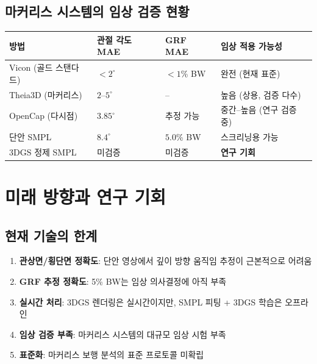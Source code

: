 \documentclass[11pt, a4paper]{report}
\begin{document}
\section{마커리스 시스템의 임상 검증 현황}

\begin{center}
\renewcommand{\arraystretch}{1.3}
\small
\begin{tabular}{p{3cm}p{2cm}p{2.5cm}p{4.5cm}}
\toprule
\textbf{방법} & \textbf{관절 각도 MAE} & \textbf{GRF MAE} & \textbf{임상 적용 가능성} \\
\midrule
Vicon (골드 스탠다드) & $<2^\circ$ & $<1$\% BW & 완전 (현재 표준) \\
Theia3D (마커리스) & $2$--$5^\circ$ & -- & 높음 (상용, 검증 다수) \\
OpenCap (다시점) & $3.85^\circ$ & 추정 가능 & 중간--높음 (연구 검증 중) \\
단안 SMPL & $8.4^\circ$ & $5.0$\% BW & 스크리닝용 가능 \\
3DGS 정제 SMPL & 미검증 & 미검증 & \textbf{연구 기회} \\
\bottomrule
\end{tabular}
\end{center}


\chapter{미래 방향과 연구 기회}
\label{ch:future}

\section{현재 기술의 한계}

\begin{enumerate}[leftmargin=*]
  \item \textbf{관상면/횡단면 정확도}: 단안 영상에서 깊이 방향 움직임 추정이 근본적으로 어려움
  \item \textbf{GRF 추정 정확도}: 5\% BW는 임상 의사결정에 아직 부족
  \item \textbf{실시간 처리}: 3DGS 렌더링은 실시간이지만, SMPL 피팅 + 3DGS 학습은 오프라인
  \item \textbf{임상 검증 부족}: 마커리스 시스템의 대규모 임상 시험 부족
  \item \textbf{표준화}: 마커리스 보행 분석의 표준 프로토콜 미확립
\end{enumerate}
\end{document}
